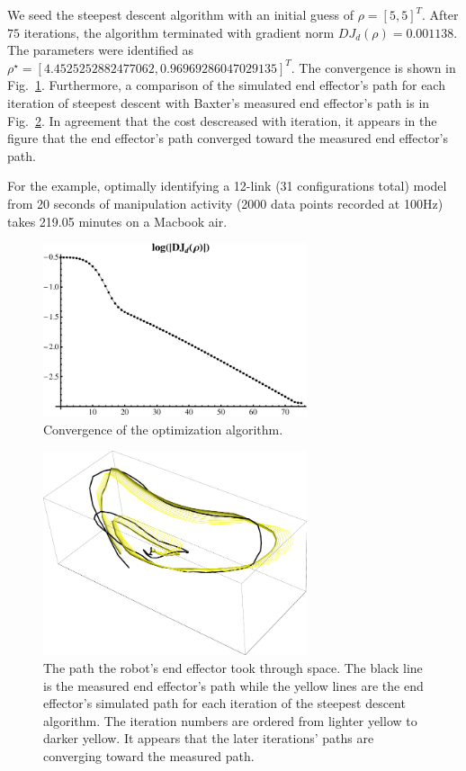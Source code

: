 \documentclass[letterpaper, 10pt, conference]{ieeeconf}
\begin{document}
We seed the steepest descent algorithm with an initial guess of $\rho = [5, 5]^T$.  After $75$ iterations, the algorithm terminated with gradient norm $DJ_d(\rho) = 0.001138$.  The parameters were identified as $\rho^\star = [4.4525252882477062, 0.96969286047029135]^T$.  The convergence is shown in Fig.~\ref{fig-conv}.
Furthermore, a comparison of the simulated end effector's path for each iteration of steepest descent with Baxter's measured end effector's path is in Fig.~\ref{fig-paths}.  In agreement that the cost descreased with iteration, it appears in the figure that the end effector's path converged toward the measured end effector's path.

For the example, optimally identifying a 12-link (31 configurations total) model from 20 seconds of manipulation activity (2000 data points recorded at 100Hz) takes 219.05 minutes on a Macbook air. 
\begin{figure}
\centering
\includegraphics[width = 220pt]{conv_12_links.pdf}
\caption{Convergence of the optimization algorithm.}
\label{fig-conv}
\end{figure}

\begin{figure}
\centering
\includegraphics[width = 220pt]{paths12.pdf}
\caption{The path the robot's end effector took through space.  The black line is the measured end effector's path while the yellow lines are the end effector's simulated path for each iteration of the steepest descent algorithm.  The iteration numbers are ordered from lighter yellow to darker yellow.  It appears that the later iterations' paths are converging toward the measured path. }
\label{fig-paths}
\end{figure}
\end{document}
